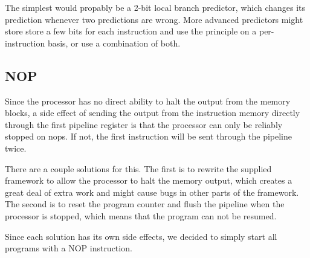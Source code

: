 The simplest would propably be a 2-bit local branch predictor, which changes its prediction whenever two predictions are wrong.
More advanced predictors might store store a few bits for each instruction and use the principle on a per-instruction basis, or use a combination of both.\cite{wiki-branching}

\subsection{NOP}

Since the processor has no direct ability to halt the output from the memory blocks, a side effect of sending the output from the instruction memory directly through the first pipeline register is that the processor can only be reliably stopped on nops.
If not, the first instruction will be sent through the pipeline twice.

There are a couple solutions for this.
The first is to rewrite the supplied framework to allow the processor to halt the memory output, which creates a great deal of extra work and might cause bugs in other parts of the framework.
The second is to reset the program counter and flush the pipeline when the processor is stopped, which means that the program can not be resumed.

Since each solution has its own side effects, we decided to simply start all
programs with a NOP instruction.


